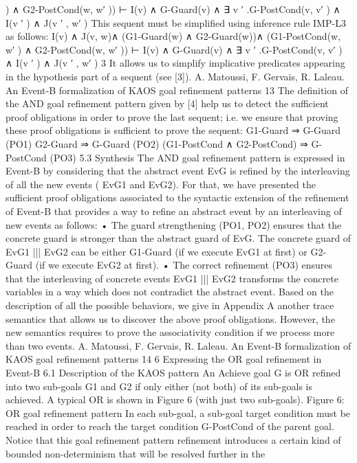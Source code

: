 ) ∧ G2-PostCond(w, w′
))
⊢
I(v) ∧ G-Guard(v) ∧ ∃ v
′
.G-PostCond(v, v′
) ∧ I(v
′
) ∧ J(v
′
, w′
)
This sequent must be simplified using inference rule IMP-L3 as follows:
I(v) ∧ J(v, w)∧
(G1-Guard(w) ∧ G2-Guard(w))∧
(G1-PostCond(w, w′
) ∧ G2-PostCond(w, w′
))
⊢
I(v) ∧ G-Guard(v) ∧ ∃ v
′
.G-PostCond(v, v′
) ∧ I(v
′
) ∧ J(v
′
, w′
)
3
It allows us to simplify implicative predicates appearing in the hypothesis part of a sequent (see [3]).
A. Matoussi, F. Gervais, R. Laleau. An Event-B formalization of KAOS goal refinement patterns 13
The definition of the AND goal refinement pattern given by [4] help us to detect the sufficient
proof obligations in order to prove the last sequent; i.e. we ensure that proving these proof
obligations is sufficient to prove the sequent:
G1-Guard ⇒ G-Guard (PO1)
G2-Guard ⇒ G-Guard (PO2)
(G1-PostCond ∧ G2-PostCond) ⇒ G-PostCond (PO3)
5.3 Synthesis
The AND goal refinement pattern is expressed in Event-B by considering that the abstract
event EvG is refined by the interleaving of all the new events ( EvG1 and EvG2). For that,
we have presented the sufficient proof obligations associated to the syntactic extension of the
refinement of Event-B that provides a way to refine an abstract event by an interleaving of
new events as follows:
• The guard strengthening (PO1, PO2) ensures that the concrete guard is stronger
than the abstract guard of EvG. The concrete guard of EvG1 ||| EvG2 can be either
G1-Guard (if we execute EvG1 at first) or G2-Guard (if we execute EvG2 at first).
• The correct refinement (PO3) ensures that the interleaving of concrete events EvG1
||| EvG2 transforms the concrete variables in a way which does not contradict the
abstract event.
Based on the description of all the possible behaviors, we give in Appendix A another
trace semantics that allows us to discover the above proof obligations. However, the new
semantics requires to prove the associativity condition if we process more than two events.
A. Matoussi, F. Gervais, R. Laleau. An Event-B formalization of KAOS goal refinement patterns 14
6 Expressing the OR goal refinement in Event-B
6.1 Description of the KAOS pattern
An Achieve goal G is OR refined into two sub-goals G1 and G2 if only either (not both) of
its sub-goals is achieved. A typical OR is shown in Figure 6 (with just two sub-goals).
Figure 6: OR goal refinement pattern
In each sub-goal, a sub-goal target condition must be reached in order to reach the target
condition G-PostCond of the parent goal. Notice that this goal refinement pattern refinement
introduces a certain kind of bounded non-determinism that will be resolved further in the
